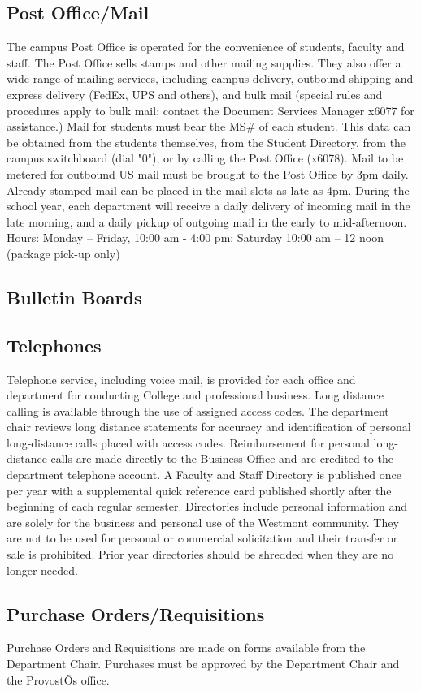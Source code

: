 \documentclass[letterpaper, 11pt]{article}
\begin{document}
	\subsection{Post Office/Mail}
		The campus Post Office is operated for the convenience of students, faculty and staff. The Post Office sells stamps and other mailing supplies. They also offer a wide range of mailing services, including campus delivery, outbound shipping and express delivery (FedEx, UPS and others), and bulk mail (special rules and procedures apply to bulk mail; contact the Document Services Manager x6077 for assistance.)
		Mail for students must bear the MS\# of each student. This data can be obtained from the students themselves, from the Student Directory, from the campus switchboard (dial "0"), or by calling the Post Office (x6078).
		Mail to be metered for outbound US mail must be brought to the Post Office by 3pm daily. Already-stamped mail can be placed in the mail slots as late as 4pm. During the school year, each department will receive a daily delivery of incoming mail in the late morning, and a daily pickup of outgoing mail in the early to mid-afternoon.
		Hours:  Monday -- Friday, 10:00 am - 4:00 pm; Saturday 10:00 am -- 12 noon (package pick-up only)
	\subsection{Bulletin Boards}
	\subsection{Telephones}
		Telephone service, including voice mail, is provided for each office and department for conducting College and professional business.  Long distance calling is available through the use of assigned access codes.  The department chair reviews long distance statements for accuracy and identification of personal long-distance calls placed with access codes.  Reimbursement for personal long-distance calls are made directly to the Business Office and are credited to the department telephone account.  A Faculty and Staff Directory is published once per year with a supplemental quick reference card published shortly after the beginning of each regular semester.  Directories include personal information and are solely for the business and personal use of the Westmont community.  They are not to be used for personal or commercial solicitation and their transfer or sale is prohibited.  Prior year directories should be shredded when they are no longer needed.
	\subsection{Purchase Orders/Requisitions}
		Purchase Orders and Requisitions are made on forms available from the Department Chair.  Purchases must be approved by the Department Chair and the ProvostÕs office.
\end{document}

